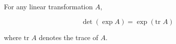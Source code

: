 For any linear transformation $A$,

$$\det (\exp A) = \exp (\text{tr } A)$$

where $\text{tr } A$ denotes the trace of $A$.
